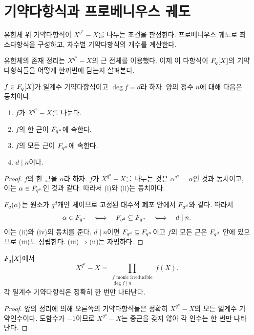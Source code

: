 \clearpage
\section{기약다항식과 프로베니우스 궤도}
\label{sec:finite-field-irreducibles}

\begin{learninggoal}
유한체 위 기약다항식이 $X^{q^n}-X$를 나누는 조건을 판정한다. 프로베니우스 궤도로 최소다항식을 구성하고, 차수별 기약다항식의 개수를 계산한다.
\end{learninggoal}

유한체의 존재 정리는 $X^{q^n}-X$의 근 전체를 이용했다. 이제 이 다항식이 $F_q[X]$의 기약다항식들을 어떻게 한꺼번에 담는지 살펴본다.

\begin{theorem}[기약인수 판정]
$f\in F_q[X]$가 일계수 기약다항식이고 $\deg f=d$라 하자. 양의 정수 $n$에 대해 다음은 동치이다.
\begin{enumerate}[label=(\roman*)]
  \item $f$가 $X^{q^n}-X$를 나눈다.
  \item $f$의 한 근이 $F_{q^n}$에 속한다.
  \item $f$의 모든 근이 $F_{q^n}$에 속한다.
  \item $d\mid n$이다.
\end{enumerate}
\end{theorem}

\begin{proof}
$f$의 한 근을 $\alpha$라 하자. $f$가 $X^{q^n}-X$를 나누는 것은 $\alpha^{q^n}=\alpha$인 것과 동치이고, 이는 $\alpha\in F_{q^n}$인 것과 같다. 따라서 (i)와 (ii)는 동치이다.

$F_q(\alpha)$는 원소가 $q^d$개인 체이므로 고정된 대수적 폐포 안에서 $F_{q^d}$와 같다. 따라서
\[
  \alpha\in F_{q^n}
  \quad\Longleftrightarrow\quad
  F_{q^d}\subseteq F_{q^n}
  \quad\Longleftrightarrow\quad
  d\mid n.
\]
이는 (ii)와 (iv)의 동치를 준다. $d\mid n$이면 $F_{q^d}\subseteq F_{q^n}$이고 $f$의 모든 근은 $F_{q^d}$ 안에 있으므로 (iii)도 성립한다. (iii)$\Rightarrow$(ii)는 자명하다.
\end{proof}

\begin{corollary}[기약다항식들의 곱]
$F_q[X]$에서
\[
  X^{q^n}-X
  =\prod_{\substack{f\text{ monic irreducible}\\ \deg f\mid n}}f(X).
\]
각 일계수 기약다항식은 정확히 한 번만 나타난다.
\end{corollary}

\begin{proof}
앞의 정리에 의해 오른쪽의 기약다항식들은 정확히 $X^{q^n}-X$의 모든 일계수 기약인수이다. 도함수가 $-1$이므로 $X^{q^n}-X$는 중근을 갖지 않아 각 인수는 한 번만 나타난다.
\end{proof}

